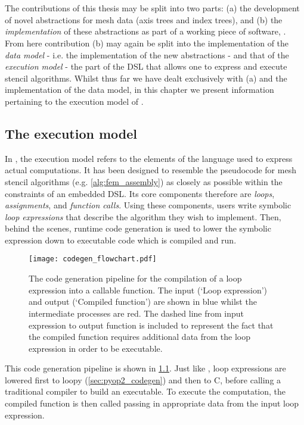 \documentclass[thesis]{subfiles}
\begin{document}
\chapter{}
\label{chapter:pyop3}

The contributions of this thesis may be split into two parts:
(a) the development of novel abstractions for mesh data (axis trees and index trees), and
(b) the \emph{implementation} of these abstractions as part of a working piece of software, .
From here contribution (b) may again be split into the implementation of the \emph{data model} - i.e. the implementation of the new abstractions - and that of the \emph{execution model} - the part of the DSL that allows one to express and execute stencil algorithms.
Whilst thus far we have dealt exclusively with (a) and the implementation of the data model, in this chapter we present information pertaining to the execution model of .

\section{The execution model}

In , the execution model refers to the elements of the language used to express actual computations.
It has been designed to resemble the pseudocode for mesh stencil algorithms (e.g. \cref{alg:fem_assembly}) as closely as possible within the constraints of an embedded DSL.
Its core components therefore are \emph{loops}, \emph{assignments}, and \emph{function calls}.
Using these components, users write symbolic \emph{loop expressions} that describe the algorithm they wish to implement.
Then, behind the scenes, runtime code generation is used to lower the symbolic expression down to executable code which is compiled and run.

\begin{figure}
  \centering
  \texttt{[image: codegen\_flowchart.pdf]}
  \caption{
    The code generation pipeline for the compilation of a loop expression into a callable function.
    The input (`Loop expression') and output (`Compiled function') are shown in blue whilst the intermediate processes are red.
    The dashed line from input expression to output function is included to represent the fact that the compiled function requires additional data from the loop expression in order to be executable.
  }
  \label{fig:codegen_flowchart}
\end{figure}

This code generation pipeline is shown in \cref{fig:codegen_flowchart}.
Just like ,  loop expressions are lowered first to loopy (\cref{sec:pyop2_codegen}) and then to C, before calling a traditional compiler to build an executable.
To execute the computation, the compiled function is then called passing in appropriate data from the input loop expression.
\end{document}
